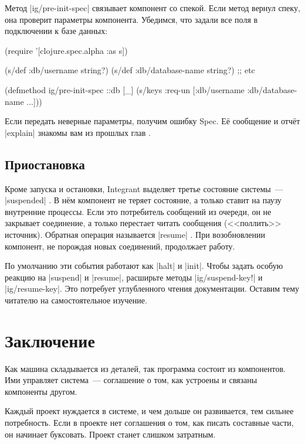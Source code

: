 Метод \spverb|ig/pre-init-spec| связывает компонент со спекой. Если метод вернул
спеку, она проверит параметры компонента. Убедимся, что задали все поля в
подключении к базе данных:

\begin{english}
  \begin{clojure}
(require '[clojure.spec.alpha :as s])

(s/def :db/username string?)
(s/def :db/database-name string?)
;; etc

(defmethod ig/pre-init-spec ::db [_]
  (s/keys :req-un [:db/username
                   :db/database-name
                   ...]))
  \end{clojure}
\end{english}

\noindent
Если передать неверные параметры, получим ошибку Spec. Е\"{е} сообщение и
отч\"{е}т \spverb|explain| знакомы вам из прошлых глав .

\subsection{Приостановка}

Кроме запуска и остановки, Integrant выделяет третье состояние системы~---
\spverb|suspended| . В н\"{е}м компонент не теряет
состояние, а только ставит на паузу внутренние процессы. Если это потребитель
сообщений из очереди, он не закрывает соединение, а только перестает читать
сообщения (<<поллить>> источник). Обратная операция называется \spverb|resume|
. При возобновлении компонент, не порождая новых соединений,
продолжает работу.

По умолчанию эти события работают как \spverb|halt| и \spverb|init|. Чтобы
задать особую реакцию на \spverb|suspend| и \spverb|resume|, расширьте методы
\spverb|ig/suspend-key!| и \spverb|ig/resume-key|. Это потребует углубленного
чтения документации. Оставим тему читателю на самостоятельное изучение.

\section{Заключение}

Как машина складывается из деталей, так программа состоит из компонентов. Ими
управляет система~--- соглашение о том, как устроены и связаны компоненты
другом.

Каждый проект нуждается в системе, и чем дольше он развивается, тем сильнее
потребность. Если в проекте нет соглашения о том, как писать составные части, он
начинает буксовать. Проект станет слишком затратным.

